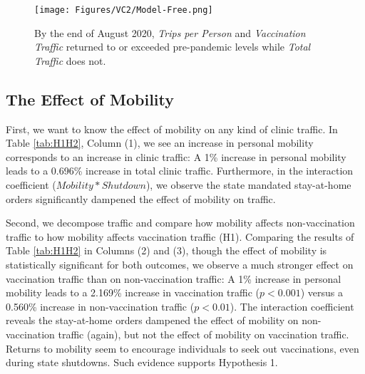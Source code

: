  \begin{figure}
     \centering
     \caption{By the end of August 2020, \textit{Trips per Person} and \textit{Vaccination Traffic} returned to or exceeded pre-pandemic levels while \textit{Total Traffic} does not.} \medskip
     \texttt{[image: Figures/VC2/Model-Free.png]}     
     \label{fig:model_free_vc2}
 \end{figure} 

\subsection{The Effect of Mobility}
 First, we want to know the effect of mobility on any kind of clinic traffic. In Table \ref{tab:H1H2}, Column (1), we see an increase in personal mobility corresponds to an increase in clinic traffic: A 1\% increase in personal mobility leads to a 0.696\% increase in total clinic traffic. Furthermore, in the interaction coefficient ($Mobility * Shutdown$), we observe the state mandated stay-at-home orders significantly dampened the effect of mobility on traffic.
 
 Second, we decompose traffic and compare how mobility affects non-vaccination traffic to how mobility affects vaccination traffic (H1). Comparing the results of Table \ref{tab:H1H2} in Columns (2) and (3), though the effect of mobility is statistically significant for both outcomes, we observe a much stronger effect on vaccination traffic than on non-vaccination traffic: A 1\% increase in personal mobility leads to a 2.169\% increase in vaccination traffic ($p < 0.001$) versus a 0.560\% increase in non-vaccination traffic ($p < 0.01$). The interaction coefficient reveals the stay-at-home orders dampened the effect of mobility on non-vaccination traffic (again), but not the effect of mobility on vaccination traffic. Returns to mobility seem to encourage individuals to seek out vaccinations, even during state shutdowns. Such evidence supports Hypothesis 1.
 
